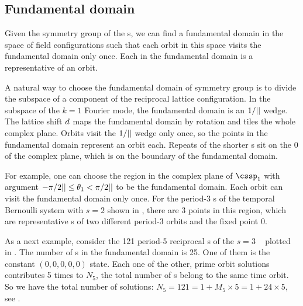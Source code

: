 

\subsection{Fundamental domain} %

Given the symmetry group of the {\lattstate}s,
we can find a fundamental domain in the space of field configurations
such that each orbit in this space visits the fundamental domain only once.
Each {\lattstate} in the fundamental domain is a representative {\lattstate} of an
orbit.

A natural way to choose the fundamental domain of \Cn{\cl{}} symmetry group
is to divide the subspace of a component of the reciprocal lattice configuration.
In the subspace of the $k=1$ Fourier mode, the fundamental domain is an $1/{||}$
wedge. The lattice shift $d$ maps the fundamental domain by rotation and
tiles the whole complex plane. Orbits visit the $1/{||}$
wedge only once, so the points in the fundamental domain represent an orbit each.
Repeats of the shorter {\lattstate}s sit on the 0 of the complex plane, which is on
the boundary of the fundamental domain.

For example, one can choose the region in the complex plane of $\cssp_1$ with
argument $-\pi/2{||}\leq\theta_1<\pi/2{||}$ to be the fundamental domain.
Each orbit can visit the fundamental domain only once. For the period-3 {\lattstate}s
of the {temporal Bernoulli system} with $s=2$ shown in ,
there are 3 points in this region, which are representative {\lattstate}s of two different
period-3 orbits and the fixed point $0$.

As a next example, consider the 121 period-5 reciprocal {\lattstate}s
of the $s=3$ \templatt\  plotted in .
The number of {\lattstate}s in the fundamental domain is 25. One of
them is the constant $(0,0,0,0,0)$ state. Each one of the other, prime orbit
solutions contributes 5 times to $N_5$, the total number of {\lattstate}s
belong to the same time orbit. So we have the total number of solutions:
$N_5=121=1+M_5\times5 = 1+24\times5$, see .
